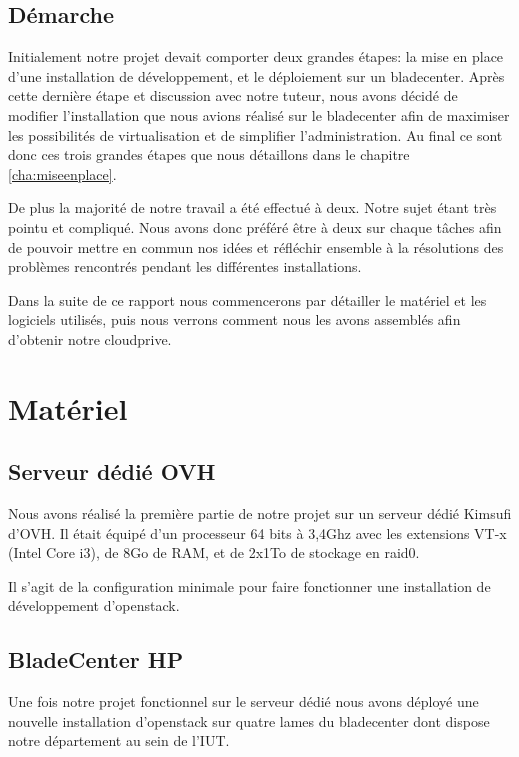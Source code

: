 \documentclass[a4paper,oneside]{report}
\begin{document}
\section{Démarche}
Initialement notre projet devait comporter deux grandes étapes: la mise en place d'une installation de développement, et le déploiement sur un \gls{bladecenter}. Après cette dernière étape et discussion avec notre tuteur, nous avons décidé de modifier l'installation que nous avions réalisé sur le \gls{bladecenter} afin de maximiser les possibilités de \gls{virtualisation} et de simplifier l'administration.\newline
Au final ce sont donc ces trois grandes étapes que nous détaillons dans le chapitre \ref{cha:miseenplace}.

De plus la majorité de notre travail a été effectué à deux.
Notre sujet étant très pointu et compliqué. 
Nous avons donc préféré être à deux sur chaque tâches afin de pouvoir mettre en commun nos idées et réfléchir ensemble à la résolutions des problèmes rencontrés pendant les différentes installations.

Dans la suite de ce rapport nous commencerons par détailler le matériel et les logiciels utilisés, puis nous verrons comment nous les avons assemblés afin d'obtenir notre \gls{cloudprive}.


\chapter{Matériel}

\section{Serveur dédié OVH}
Nous avons réalisé la première partie de notre projet sur un serveur dédié Kimsufi d'OVH.
Il était équipé d'un processeur 64 bits à 3,4Ghz avec les extensions VT-x (Intel Core i3), de 8Go de RAM, et de 2x1To de stockage en \gls{raid0}.

Il s'agit de la configuration minimale pour faire fonctionner une installation de développement d'\gls{openstack}.

\section{BladeCenter HP}
Une fois notre projet fonctionnel sur le serveur dédié nous avons déployé une nouvelle installation d'\gls{openstack} sur quatre lames du \gls{bladecenter} dont dispose notre département au sein de l'IUT.
\end{document}
